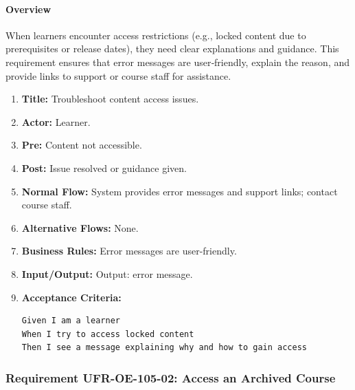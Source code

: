 \paragraph{Overview}
When learners encounter access restrictions (e.g., locked content due to prerequisites or release dates), they need clear explanations and guidance. This requirement ensures that error messages are user‑friendly, explain the reason, and provide links to support or course staff for assistance.
\begin{enumerate}[label=\textbf{\arabic*.}]
\item \textbf{Title:} Troubleshoot content access issues.
\item \textbf{Actor:} Learner.
\item \textbf{Pre:} Content not accessible.
\item \textbf{Post:} Issue resolved or guidance given.
\item \textbf{Normal Flow:} System provides error messages and support links; contact course staff.
\item \textbf{Alternative Flows:} None.
\item \textbf{Business Rules:} Error messages are user-friendly.
\item \textbf{Input/Output:} Output: error message.
\item \textbf{Acceptance Criteria:}
    \begin{verbatim}
Given I am a learner
When I try to access locked content
Then I see a message explaining why and how to gain access
    \end{verbatim}
\end{enumerate}

\subsubsection{Requirement UFR-OE-105-02: Access an Archived Course}
